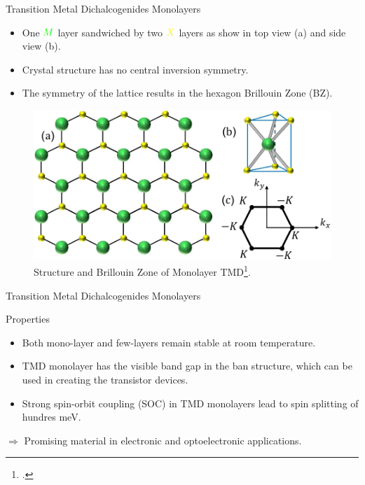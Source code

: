\documentclass[aspectratio=169,compress,x11names]{beamer}
\begin{document}
	\begin{frame}{Transition Metal Dichalcogenides Monolayers}
		\begin{multicols}{2}
			\begin{itemize}
				\item One $\color{green}M$ layer sandwiched by two $\color{yellow}X$ layers as show in top view (a) and side view (b).
				\item Crystal structure has no central inversion symmetry.
				\item The symmetry of the lattice results in the hexagon Brillouin Zone (BZ).
			\end{itemize}
			\columnbreak
			\vfil
			\begin{figure}
				\includegraphics[width=\linewidth]{./pic/latticePresent.pdf}
				\caption{Structure and Brillouin Zone of Monolayer TMD\footcite{PhysRevB.88.085433}.}
			\end{figure}
		\end{multicols}
	\end{frame}
	\begin{frame}{Transition Metal Dichalcogenides Monolayers}
		\begin{block}{Properties}
			\begin{itemize}
				\item Both mono-layer and few-layers remain stable at room temperature.
				\item TMD monolayer has the visible band gap in the ban structure, which can be used in creating the transistor devices\footnotemark.
				\item  Strong spin-orbit coupling (SOC) in TMD monolayers lead to spin splitting of hundres meV.
			\end{itemize}
		\end{block}
		$\Rightarrow$ Promising material in electronic and optoelectronic applications.
	\end{frame}
\end{document}
